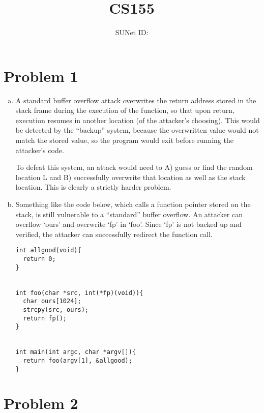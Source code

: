 \documentclass{article}
\title{CS155 \exerciseset}
\author{\studentname \qquad SUNet ID: \suid}
\begin{document}
\maketitle

\section*{Problem 1}
\begin{enumerate}[(a)]
\item A standard buffer overflow attack overwrites the return address stored in the stack frame during the execution of the function, so that upon return, execution resumes in another location (of the attacker's choosing). This would be detected by the ``backup'' system, because the overwritten value would not match the stored value, so the program would exit before running the attacker's code.

  To defeat this system, an attack would need to A) guess or find the random location L and B) successfully overwrite that location as well as the stack location. This is clearly a strictly harder problem.

\item Something like the code below, which calls a function pointer stored on the stack, is still vulnerable to a ``standard'' buffer overflow. An attacker can overflow `ours' and overwrite `fp' in `foo'. Since `fp' is not backed up and verified, the attacker can successfully redirect the function call.

\begin{verbatim}
int allgood(void){
  return 0;
}


int foo(char *src, int(*fp)(void)){
  char ours[1024];
  strcpy(src, ours);
  return fp();
}


int main(int argc, char *argv[]){
  return foo(argv[1], &allgood);
}

\end{verbatim}

\end{enumerate}

\newpage
\section*{Problem 2}
\end{document}
